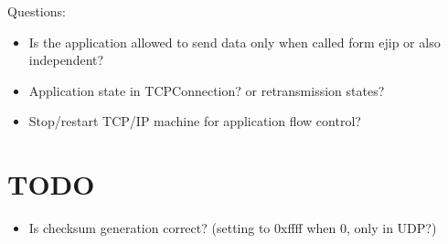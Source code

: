 Questions:
\begin{itemize}
    \item Is the application allowed to send data only when called
    form ejip or also independent?
    \item Application state in TCPConnection? or retransmission
    states?
    \item Stop/restart TCP/IP machine for application flow control?
\end{itemize}

\section{TODO}

\begin{itemize}
    \item Is checksum generation correct? (setting to 0xffff when 0,
    only in UDP?)
\end{itemize}
